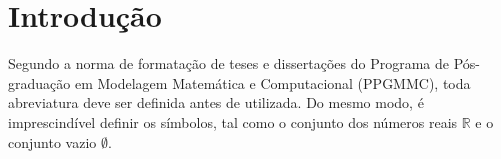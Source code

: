 \chapter{Introdução}

Segundo a norma de formata{\c c}\~ao de teses e disserta{\c c}\~oes do
Programa de Pós-graduação em Modelagem Matemática e Computacional (PPGMMC), 
toda abreviatura deve ser definida antes de utilizada.
Do mesmo modo, \'e imprescind\'ivel definir os s\'imbolos, tal como o
conjunto dos n\'umeros reais $\mathbb{R}$ e o conjunto vazio $\emptyset$.
